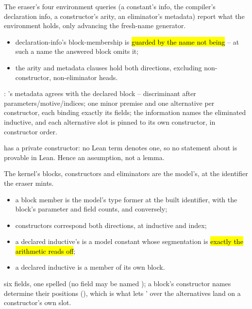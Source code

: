 \begin{definition}
\label{def:LookupAdequate}
\leanok
{} The eraser's four environment queries (a constant's info, the compiler's
declaration info, a constructor's arity, an eliminator's metadata) report what the environment
holds, only advancing the fresh-name generator.
\begin{itemize}
\item declaration-info's block-membership is \hl{guarded by the name not being
} -- at such a name the answered block omits it;
\item the arity and metadata clauses hold both directions, excluding non-constructor,
non-eliminator heads.
\end{itemize}
 : 's metadata agrees with the declared block --
discriminant after parameters/motive/indices; one minor premise and one alternative per
constructor, each binding exactly its fields; the information names the eliminated inductive, and
each alternative slot is pinned to its own constructor, in constructor order.
\end{definition}

\begin{remark}
  has a private constructor: no Lean term denotes one, so no
statement about  is provable in Lean. Hence an assumption, not a lemma.
\end{remark}

\begin{definition}
\label{def:BlockAdequate}
\leanok
{} The kernel's blocks, constructors and eliminators are the model's, at the \lbox{}
identifier the eraser mints.
\begin{itemize}
\item a block member is the model's type former at the built identifier, with the block's
parameter and field counts, and conversely;
\item constructors correspond both directions, at inductive and index;
\item a declared inductive's  is a model constant whose segmentation is \hl{exactly
the arithmetic  reads off};
\item a declared inductive is a member of its own block.
\end{itemize}
 six fields, one spelled  (no field may be named ); a
block's constructor names determine their positions (), which is
what lets '  over the alternatives land on a constructor's own
slot.
\end{definition}

